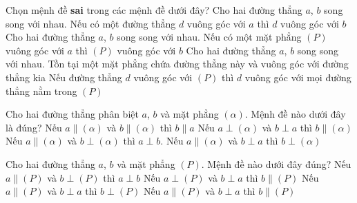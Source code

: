 \begin{ex}%
	Chọn mệnh đề \textbf{sai} trong các mệnh đề dưới đây?
	\choice
	{Cho hai đường thẳng $a$, $ b$ song song với nhau. Nếu có một đường thẳng $d$ vuông góc với $a$ thì $d$ vuông góc với $b$}
	{Cho hai đường thẳng $a$, $b$ song song với nhau. Nếu có một mặt phẳng $(P)$ vuông góc với $a$ thì $(P)$ vuông góc với $b$}
	{\True Cho hai đường thẳng $a$, $b$ song song với nhau. Tồn tại một mặt phẳng chứa đường thẳng này và vuông góc với đường thẳng kia}
	{Nếu đường thẳng $d$ vuông góc với $(P)$ thì $d$ vuông góc với mọi đường thẳng nằm trong $(P)$}
\end{ex}

\begin{ex}%
	Cho hai đường thẳng phân biệt $a$, $b$ và mặt phẳng $(\alpha)$. Mệnh đề nào dưới đây là đúng? 
	\choice
	{Nếu $a\parallel (\alpha)$ và $b\parallel (\alpha)$ thì $b\parallel a$ }
	{  Nếu $a\perp (\alpha)$ và $b\perp a$ thì $b\parallel (\alpha)$}
	{\True Nếu $a\parallel (\alpha)$ và $b\perp (\alpha)$ thì $a\perp b$.}
	{Nếu $a\parallel (\alpha)$ và $b\perp a$ thì $b\perp (\alpha)$ }
\end{ex}

\begin{ex}%
	Cho hai đường thẳng $a$, $b$ và mặt phẳng $(P)$. Mệnh đề nào dưới đây đúng?
	\choice
	{\True Nếu $a\parallel (P)$ và $b\perp (P)$ thì $a\perp b$}
	{Nếu $a\perp (P)$ và $b\perp a$ thì $b\parallel (P)$}
	{Nếu $a\parallel (P)$ và $b\perp a$ thì $b\perp (P)$}
	{Nếu $a\parallel (P)$ và $b\perp a$ thì $b\parallel (P)$}
\end{ex}

